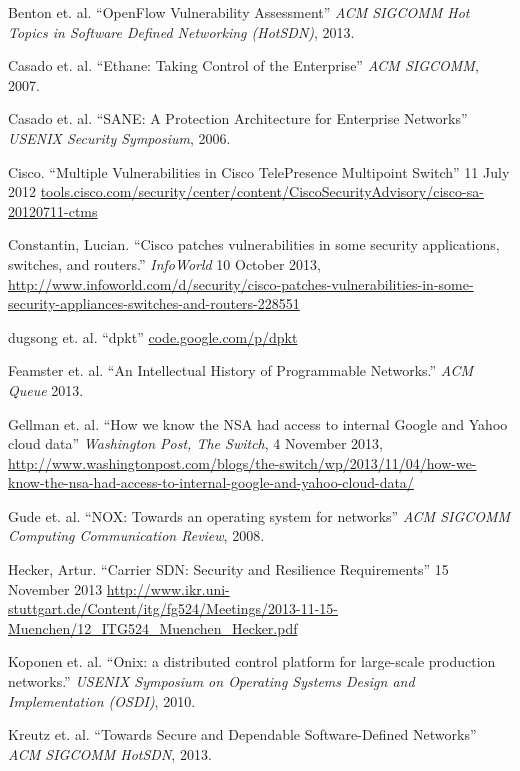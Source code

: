 \begin{thebibliography}{99}

 Benton et. al. ``OpenFlow Vulnerability Assessment'' \emph{ACM SIGCOMM Hot Topics in Software Defined Networking (HotSDN)}, 2013. 

 Casado et. al. ``Ethane: Taking Control of the Enterprise'' \emph{ACM SIGCOMM}, 2007.

 Casado et. al. ``SANE: A Protection Architecture for Enterprise Networks'' \emph{USENIX Security Symposium}, 2006.

 Cisco. ``Multiple Vulnerabilities in Cisco TelePresence Multipoint Switch'' 11 July 2012 \url{tools.cisco.com/security/center/content/CiscoSecurityAdvisory/cisco-sa-20120711-ctms}

 Constantin, Lucian. ``Cisco patches vulnerabilities in some security applications, switches, and routers.'' \emph{InfoWorld} 10 October 2013, \url{http://www.infoworld.com/d/security/cisco-patches-vulnerabilities-in-some-security-appliances-switches-and-routers-228551}

 dugsong et. al. ``dpkt'' \url{code.google.com/p/dpkt}

 Feamster et. al. ``An Intellectual History of Programmable Networks.'' \emph{ACM Queue} 2013.

 Gellman et. al. ``How we know the NSA had access to internal Google and Yahoo cloud data'' \emph{Washington Post, The Switch}, 4 November 2013, \url{http://www.washingtonpost.com/blogs/the-switch/wp/2013/11/04/how-we-know-the-nsa-had-access-to-internal-google-and-yahoo-cloud-data/}

 Gude et. al. ``NOX: Towards an operating system for networks'' \emph{ACM SIGCOMM Computing Communication Review}, 2008.

 Hecker, Artur. ``Carrier SDN: Security and Resilience Requirements'' 15 November 2013 \url{http://www.ikr.uni-stuttgart.de/Content/itg/fg524/Meetings/2013-11-15-Muenchen/12_ITG524_Muenchen_Hecker.pdf}

 Koponen et. al. ``Onix: a distributed control platform for large-scale production networks.'' \emph{USENIX Symposium on Operating Systems Design and Implementation (OSDI)}, 2010.

 Kreutz et. al. ``Towards Secure and Dependable Software-Defined Networks'' \emph{ACM SIGCOMM HotSDN}, 2013.


\end{thebibliography}
